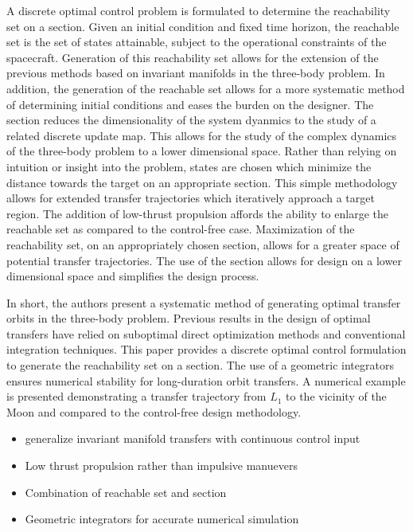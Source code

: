 \documentclass[preprint]{elsarticle}
\begin{document}
A discrete optimal control problem is formulated to determine the reachability set on a \Poincare section.
Given an initial condition and fixed time horizon, the reachable set is the set of states attainable, subject to the operational constraints of the spacecraft. 
Generation of this reachability set allows for the extension of the previous methods based on invariant manifolds in the three-body problem.
In addition, the generation of the reachable set allows for a more systematic method of determining initial conditions and eases the burden on the designer. 
The \Poincare section reduces the dimensionality of the system dyanmics to the study of a related discrete update map.  
This allows for the study of the complex dynamics of the three-body problem to a lower dimensional space.
Rather than relying on intuition or insight into the problem, states are chosen which minimize the distance towards the target on an appropriate \Poincare section.
This simple methodology allows for extended transfer trajectories which iteratively approach a target region.
The addition of low-thrust propulsion affords the ability to enlarge the reachable set as compared to the control-free case.
Maximization of the reachability set, on an appropriately chosen \Poincare section, allows for a greater space of potential transfer trajectories.
The use of the \Poincare section allows for design on a lower dimensional space and simplifies the design process.

In short, the authors present a systematic method of generating optimal transfer orbits in the three-body problem.
Previous results in the design of optimal transfers have relied on suboptimal direct optimization methods and conventional integration techniques.
This paper provides a discrete optimal control formulation to generate the reachability set on a \Poincare section.
The use of a geometric integrators ensures numerical stability for long-duration orbit transfers.
A numerical example is presented demonstrating a transfer trajectory from \( L_1 \) to the vicinity of the Moon and compared to the control-free design methodology.
\begin{itemize}
	\item generalize invariant manifold transfers with continuous control input
	\item Low thrust propulsion rather than impulsive manuevers
	\item Combination of reachable set and \Poincare section
	\item Geometric integrators for accurate numerical simulation
\end{itemize}
\end{document}
